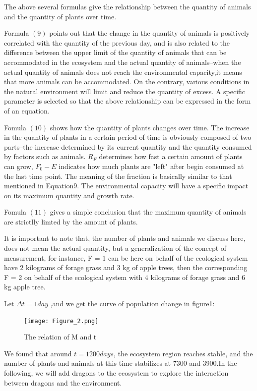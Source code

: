 \documentclass{mcmthesis}
\begin{document}
The above several formulas give the relationship between the quantity of animals and the quantity of plants over time.

Formula $(9)$ points out that the change in the quantity of animals is positively correlated with the quantity of the previous day, and is also related to the difference between the upper limit of the quantity of animals that can be accommodated in the ecosystem and the actual quantity of animals--when the actual quantity of animals does not reach the environmental capacity,it means that more animals can be accommodated. On the contrary, various conditions in the natural environment will limit and reduce the quantity of excess. A specific parameter is selected so that the above relationship can be expressed in the form of an equation.

Fomula $(10)$ shows how the quantity of plants changes over time. The increase in the quantity of plants in a certain period of time is obviously composed of two parts--the increase determined by its current quantity and the quantity consumed by factors such as animals. $R_F$ determines how fast a certain amount of plants can grow, $F_0-E$ indicates how much plants are "left" after begin consumed at the last time point. The meaning of the fraction is basically similar to that mentioned in Equation$9$. The environmental capacity will have a specific impact on its maximum quantity and growth rate.

Fomula $(11)$ gives a simple conclusion that the maximum quantity of animals are strictlly limted by the amount of plants.

It is important to note that, the number of plants and animals we discuss here, does not mean the actual quantity, but a generalization of the concept of measurement, for instance, F = 1 can be here on behalf of the ecological system have 2 kilograms of forage grass and 3 kg of apple trees, then the corresponding F = 2 on behalf of the ecological system with 4 kilograms of forage grass and 6 kg apple tree.

Let $\Delta t=1day$ ,and we get the curve of population change in figure\ref{Figure_2}:
\begin{figure}[!htbp]
\centering
\texttt{[image: Figure\_2.png]}
\caption{The relation of M and t}\label{Figure_2}
\end{figure}

We found that around $t=1200days$, the ecosystem region reaches stable, and the number of plants and animals at this time stabilizes at 7300 and 3900.In the following, we will add dragons to the ecosystem to explore the interaction between dragons and the environment.
\end{document}
